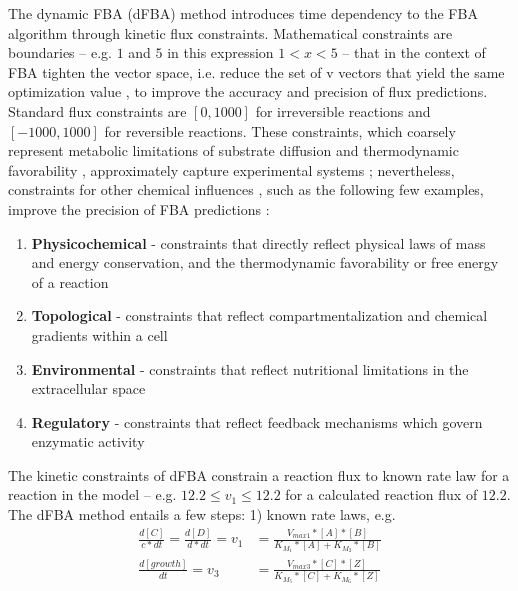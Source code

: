 The dynamic FBA (dFBA) method introduces time dependency to the FBA algorithm through kinetic flux constraints. Mathematical constraints are boundaries -- e.g. $1$ and $5$ in this expression $1<x<5$ -- that in the context of FBA tighten the vector space, i.e. reduce the set of v vectors that yield the same optimization value \cite{Covert2008IntegratingColi}, to improve the accuracy and precision of flux predictions. Standard flux constraints are $[0,1000]$ for irreversible reactions and $[-1000,1000]$ for reversible reactions. These constraints, which coarsely represent metabolic limitations of substrate diffusion and thermodynamic favorability \cite{Peres2017HowModes}, approximately capture experimental systems \cite{Edwards2001InData, Kauffman2003AdvancesAnalysis}; nevertheless, constraints for other chemical influences \cite{Fleming2010IntegratedMetabolism}, such as the following few examples, improve the precision of FBA predictions \cite{Magnusdottir2017GenerationMicrobiota}: 
\begin{enumerate}
    \item \textbf{Physicochemical} - constraints that directly reflect physical laws of mass and energy conservation, and the thermodynamic favorability or free energy of a reaction \cite{Henry2007}
    \item \textbf{Topological} - constraints that reflect compartmentalization and chemical gradients within a cell \cite{Price2004Genome-scaleConstraints}
    \item \textbf{Environmental} - constraints that reflect nutritional limitations in the extracellular space 
    \item \textbf{Regulatory} - constraints that reflect feedback mechanisms which govern enzymatic activity \cite{Covert2001RegulationMetabolism}
\end{enumerate}
The kinetic constraints of dFBA constrain a reaction flux to known rate law for a reaction in the model \cite{Machado2012ExploringMetabolism, Pernice2019IntegratingPractice, Mahadevan2002DynamicColi,Mahadevan2003TheModels} -- e.g. $12.2\le v_1 \le 12.2$ for a calculated reaction flux of $12.2$. The dFBA method entails a few steps: 1) known rate laws, e.g. 
\begin{equation} \label{rate_laws}
    \begin{split}
        \frac{d[C]}{c*dt} = \frac{d[D]}{d*dt} = v_1 &= \frac{V_{max1}*[A]*[B]}{K_{M_1}*[A]+K_{M_2}*[B]} \\
        \frac{d[growth]}{dt} = v_3 &= \frac{V_{max3}*[C]*[Z]}{K_{M_5}*[C]+K_{M_6}*[Z]}
    \end{split}
\end{equation}
